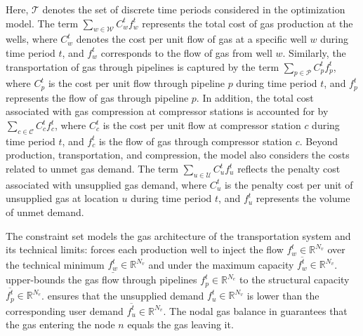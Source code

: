 Here, $\mathcal{T}$ denotes the set of discrete time periods considered in the optimization model. The term $\sum_{w \in \mathcal{W}} C_{w}^t {f_{w}^t}$ represents the total cost of gas production at the wells, where $C_{w}^t$ denotes the cost per unit flow of gas at a specific well $w$ during time period $t$, and $f_{w}^t$ corresponds to the flow of gas from well $w$. Similarly, the transportation of gas through pipelines is captured by the term $\sum_{p \in \mathcal{P}} C_{p}^t {f_{p}^t}$, where $C_{p}^t$ is the cost per unit flow through pipeline $p$ during time period $t$, and $f_{p}^t$ represents the flow of gas through pipeline $p$. In addition, the total cost associated with gas compression at compressor stations is accounted for by $\sum_{c \in \mathcal{C}} C_{c}^t {f_{c}^t}$, where $C_{c}^t$ is the cost per unit flow at compressor station $c$ during time period $t$, and $f_{c}^t$ is the flow of gas through compressor station $c$. Beyond production, transportation, and compression, the model also considers the costs related to unmet gas demand. The term $\sum_{u \in \mathcal{U}} C_{u}^{t} {f_{u}^{t}}$ reflects the penalty cost associated with unsupplied gas demand, where $C_{u}^{t}$ is the penalty cost per unit of unsupplied gas at location $u$ during time period $t$, and $f_{u}^{t}$ represents the volume of unmet demand. 

    The constraint set models the gas architecture of the transportation system and its technical limits:  forces each production well to inject the flow $f_{w}^t \in \mathbb{R}^{N_v} $ over the technical minimum $\underline{f_{w}^t}  \in \mathbb{R}^{N_v}$ and under the maximum capacity $\overline{f_{w}^t} \in \mathbb{R}^{N_v}$.  upper-bounds the gas flow through pipelines $f_{p}^t \in \mathbb{R}^{N_e} $ to the structural capacity $\overline{f_{p}^t} \in \mathbb{R}^{N_e} $.  ensures that the unsupplied demand $f_{u}^{t}\in \mathbb{R}^{N_v}$ is lower than the corresponding user demand $\overline{f_{u}^{t}}\in \mathbb{R}^{N_v}$. The nodal gas balance in  guarantees that the gas entering the node $n$ equals the gas leaving it. 

